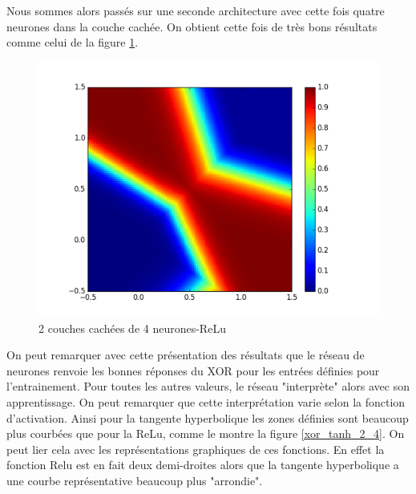 Nous sommes alors passés sur une seconde architecture avec cette fois quatre neurones dans la couche cachée. On obtient cette fois de très bons résultats comme celui de la figure \ref{xor_relu_2_4}.

\begin{figure}[!h]
\begin{center}
\includegraphics[scale=0.6]{images/xor_relu_2_4.png}
\caption{2 couches cachées de 4 neurones-ReLu}
\label{xor_relu_2_4}
\end{center}
\end{figure}

On peut remarquer avec cette présentation des résultats que le réseau de neurones renvoie les bonnes réponses du XOR pour les entrées définies pour l'entrainement. Pour toutes les autres valeurs,  le réseau "interprète" alors avec son apprentissage. On peut remarquer que cette interprétation varie selon la fonction d'activation. Ainsi pour la tangente hyperbolique les zones définies sont beaucoup plus courbées que pour la ReLu, comme le montre la figure \ref{xor_tanh_2_4}. On peut lier cela avec les représentations graphiques de ces fonctions. En effet la fonction Relu est en fait deux demi-droites alors que la tangente hyperbolique a une courbe représentative beaucoup plus "arrondie".

